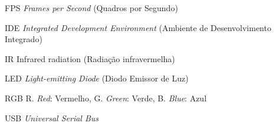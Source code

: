 %
%

\begin{siglas}
  \setlength{\baselineskip}{0.7\baselineskip}
  
  \item[FPS] \textit{Frames per Second} (Quadros por Segundo)
  \item[IDE] \textit{Integrated Development Environment} (Ambiente de Desenvolvimento Integrado)
  \item[IR] Infrared radiation (Radiação infravermelha)
  \item[LED] \textit{Light-emitting Diode} (Diodo Emissor de Luz)
  \item[RGB] R. \textit{Red}: Vermelho, G. \textit{Green}: Verde, B. \textit{Blue}: Azul
  \item[USB] \textit{Universal Serial Bus}
\end{siglas}
